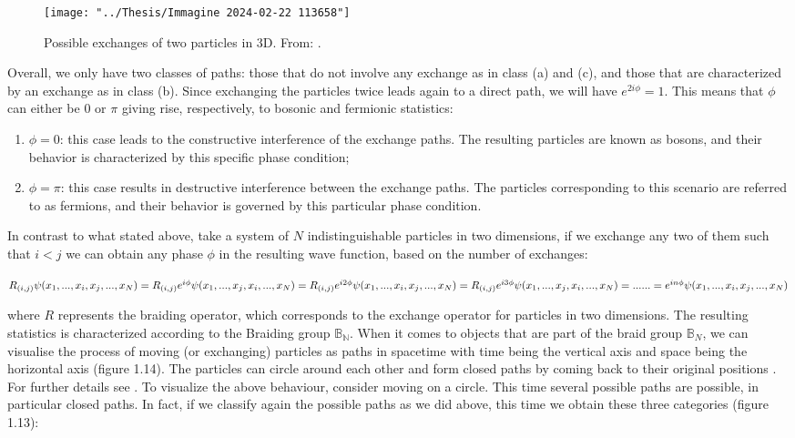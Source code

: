 \documentclass{Configuration_Files/PoliMi3i_thesis}
\begin{document}
\begin{figure}
	\centering
	\texttt{[image: "../Thesis/Immagine 2024-02-22 113658"]}
	\caption{{ Possible exchanges of two particles in 3D. From: \cite{Rao16}.}}
	\label{fig:immagine-2024-02-22-113658}
\end{figure}

Overall, we only have two classes of paths: those that do not involve any exchange as in class (a) and (c), and those that are characterized by an exchange as in class (b). 
Since exchanging the particles twice leads again to a direct path, we will have $e^{2i \phi} = 1$. This means that $\phi$ can either be 0 or $\pi$ giving rise, respectively, to bosonic and fermionic statistics: 

\begin{enumerate}
	\item $\phi = 0$: this case leads to the constructive interference of the exchange paths. The resulting particles are known as bosons, and their behavior is characterized by this specific phase condition;
	
	\item $\phi = \pi$: this case results in destructive interference between the exchange paths. The particles corresponding to this scenario are referred to as fermions, and their behavior is governed by this particular phase condition.
\end{enumerate}

In contrast to what stated above, take a system of $N$ indistinguishable particles in two dimensions, if we exchange any two of them such that $i<j$ we can obtain any phase $\phi$ in the resulting wave function, based on the number of exchanges:  

\begin{center}	
	$R_{(i,j)}\psi(x_1, ..., x_i,x_j, ..., x_N)=R_{(i,j)} e^{i\phi} \psi(x_1, ..., x_j,x_i, ..., x_N)= R_{(i,j)} e^{i2\phi} \psi(x_1, ..., x_i,x_j, ..., x_N)=R_{(i,j)} e^{i3\phi} \psi(x_1, ..., x_j,x_i, ..., x_N)= ... \ \newline
	... = e^{in\phi} \psi(x_1, ..., x_i,x_j, ..., x_N)$
\end{center}

where $R$ represents the braiding operator, which corresponds to the exchange operator for particles in two dimensions. The resulting statistics is characterized according to the Braiding group  $\mathbb{B_N}$. When it comes to objects that are part of the braid group $\mathbb{B}_N$, we can visualise the process of moving (or exchanging) particles as paths in spacetime with time being the vertical axis and space being the horizontal axis (figure 1.14). The particles can circle around each other and form closed paths by coming back to their original positions {\cite{Wil91}}. For further details see {\cite{Rao16, Wil91}}.
To visualize the above behaviour, consider moving on a circle. This time several possible paths are possible, in particular closed paths. In fact, if we classify again the possible paths as we did above, this time we obtain these three categories (figure 1.13):
\end{document}
